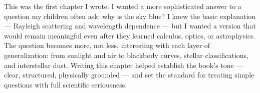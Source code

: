 \begin{commentary}
This was the first chapter I wrote. I wanted a more sophisticated answer to a question my children often ask: why is the sky blue? I knew the basic explanation — Rayleigh scattering and wavelength dependence — but I wanted a version that would remain meaningful even after they learned calculus, optics, or astrophysics. The question becomes more, not less, interesting with each layer of generalization: from sunlight and air to blackbody curves, stellar classifications, and interstellar dust. Writing this chapter helped establish the book’s tone — clear, structured, physically grounded — and set the standard for treating simple questions with full scientific seriousness.
\end{commentary}